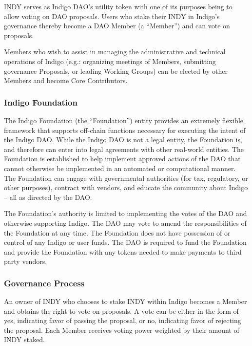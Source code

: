 \documentclass{article}
\begin{document}
\begin{sloppypar}
\protect\hyperlink{indy}{INDY} serves as Indigo DAO's utility token with
one of its purposes being to allow voting on DAO proposals. Users who
stake their INDY in Indigo's governance thereby become a DAO Member (a
``Member'') and can vote on proposals.

Members who wish to assist in managing the administrative and technical
operations of Indigo (e.g.: organizing meetings of Members, submitting
governance Proposals, or leading Working Groups) can be elected by other
Members and become Core Contributors.

\hypertarget{indigo-foundation}{%
\subsubsection{Indigo Foundation}\label{indigo-foundation}}

The Indigo Foundation (the ``Foundation'') entity provides an extremely
flexible framework that supports off-chain functions necessary for
executing the intent of the Indigo DAO. While the Indigo DAO is not a
legal entity, the Foundation is, and therefore can enter into legal
agreements with other real-world entities. The Foundation is established
to help implement approved actions of the DAO that cannot otherwise be
implemented in an automated or computational manner. The Foundation can
engage with governmental authorities (for tax, regulatory, or other
purposes), contract with vendors, and educate the community about Indigo
-- all as directed by the DAO.

The Foundation's authority is limited to implementing the votes of the
DAO and otherwise supporting Indigo. The DAO may vote to amend the
responsibilities of the Foundation at any time. The Foundation does not
have possession of or control of any Indigo or user funds. The DAO is
required to fund the Foundation and provide the Foundation with any
tokens needed to make payments to third party vendors.

\hypertarget{governance-process}{%
\subsubsection{Governance Process}\label{governance-process}}

An owner of INDY who chooses to stake INDY within Indigo becomes a
Member and obtains the right to vote on proposals. A vote can be either
in the form of yes, indicating favor of passing the proposal, or no,
indicating favor of rejecting the proposal. Each Member receives voting
power weighted by their amount of INDY staked.


\end{sloppypar}
\end{document}
